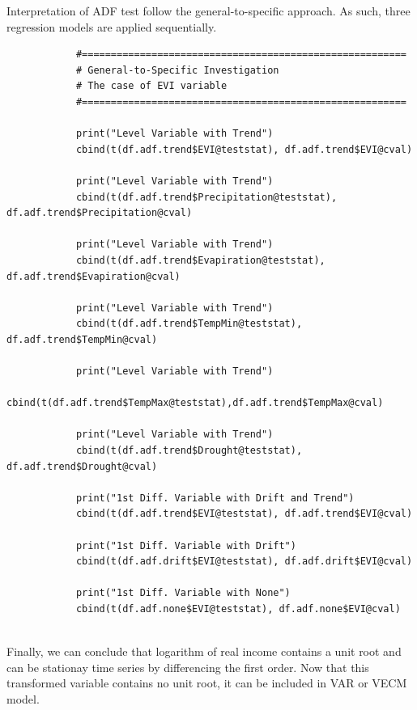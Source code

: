\documentclass[12pt,a4paper]{book}
\begin{document}
			Interpretation of ADF test follow the general-to-specific approach. As such, three regression models are applied sequentially.
				\begin{shaded}
				\begin{verbatim}
			#========================================================
			# General-to-Specific Investigation
			# The case of EVI variable
			#========================================================
			
			print("Level Variable with Trend")
			cbind(t(df.adf.trend$EVI@teststat), df.adf.trend$EVI@cval)
			
			print("Level Variable with Trend")
			cbind(t(df.adf.trend$Precipitation@teststat), df.adf.trend$Precipitation@cval)
			
			print("Level Variable with Trend")
			cbind(t(df.adf.trend$Evapiration@teststat), df.adf.trend$Evapiration@cval)
			
			print("Level Variable with Trend")
			cbind(t(df.adf.trend$TempMin@teststat), df.adf.trend$TempMin@cval)
			
			print("Level Variable with Trend")
			cbind(t(df.adf.trend$TempMax@teststat),df.adf.trend$TempMax@cval)
			
			print("Level Variable with Trend")
			cbind(t(df.adf.trend$Drought@teststat), df.adf.trend$Drought@cval)
			
			print("1st Diff. Variable with Drift and Trend")
			cbind(t(df.adf.trend$EVI@teststat), df.adf.trend$EVI@cval)
			
			print("1st Diff. Variable with Drift")
			cbind(t(df.adf.drift$EVI@teststat), df.adf.drift$EVI@cval)
			
			print("1st Diff. Variable with None")
			cbind(t(df.adf.none$EVI@teststat), df.adf.none$EVI@cval)
			
				\end{verbatim}
		\end{shaded}
	
			Finally, we can conclude that logarithm of real income contains a unit root and 
			can be stationay time series by differencing the first order. Now that this transformed
			 variable contains no unit root, it can be included in VAR or VECM model.
			
\end{document}
